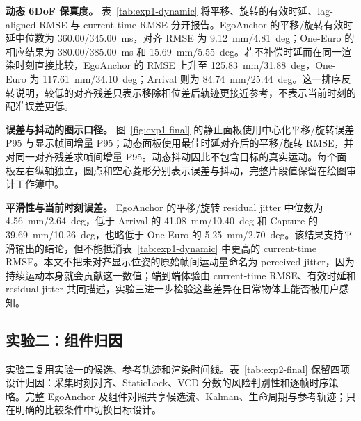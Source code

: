 \documentclass[review]{vgtc}
\begin{document}
\textbf{动态 6DoF 保真度。} 表~\ref{tab:exp1-dynamic} 将平移、旋转的有效时延、lag-aligned RMSE 与 current-time RMSE 分开报告。EgoAnchor 的平移/旋转有效时延中位数为 360.00/345.00~ms，对齐 RMSE 为 9.12~mm/4.81~deg；One-Euro 的相应结果为 380.00/385.00~ms 和 15.69~mm/5.55~deg。若不补偿时延而在同一渲染时刻直接比较，EgoAnchor 的 RMSE 上升至 125.83~mm/31.88~deg，One-Euro 为 117.61~mm/34.10~deg；Arrival 则为 84.74~mm/25.44~deg。这一排序反转说明，较低的对齐残差只表示移除相位差后轨迹更接近参考，不表示当前时刻的配准误差更低。

\textbf{误差与抖动的图示口径。} 图~\ref{fig:exp1-final} 的静止面板使用中心化平移/旋转误差 P95 与显示帧间增量 P95；动态面板使用最佳时延对齐后的平移/旋转 RMSE，并对同一对齐残差求帧间增量 P95。动态抖动因此不包含目标的真实运动。每个面板左右纵轴独立，圆点和空心菱形分别表示误差与抖动，完整片段值保留在绘图审计工作簿中。

\textbf{平滑性与当前时刻误差。} EgoAnchor 的平移/旋转 residual jitter 中位数为 4.56~mm/2.64~deg，低于 Arrival 的 41.08~mm/10.40~deg 和 Capture 的 39.69~mm/10.26~deg，也略低于 One-Euro 的 5.25~mm/2.70~deg。该结果支持平滑输出的结论，但不能抵消表~\ref{tab:exp1-dynamic} 中更高的 current-time RMSE。本文不把未对齐显示位姿的原始帧间运动量命名为 perceived jitter，因为持续运动本身就会贡献这一数值；端到端体验由 current-time RMSE、有效时延和 residual jitter 共同描述，实验三进一步检验这些差异在日常物体上能否被用户感知。


\subsection{实验二：组件归因}

实验二复用实验一的候选、参考轨迹和渲染时间线。表~\ref{tab:exp2-final} 保留四项设计归因：采集时刻对齐、StaticLock、VCD 分数的风险判别性和逐帧时序策略。完整 EgoAnchor 及组件对照共享候选流、Kalman、生命周期与参考轨迹；只在明确的比较条件中切换目标设计。
\end{document}
